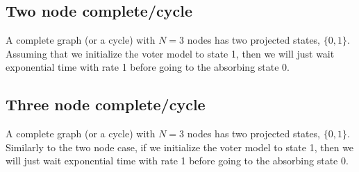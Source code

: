 \subsection{Two node complete/cycle}
A complete graph (or a cycle) with $N = 3$ nodes has two projected states, $\{0,1\}$.
Assuming that we initialize the voter model to state 1, then we will just wait exponential time with rate 1 before going to the absorbing state 0.

\subsection{Three node complete/cycle}
A complete graph (or a cycle) with $N = 3$ nodes has two projected states, $\{0,1\}$.
Similarly to the two node case, if we initialize the voter model to state 1, then we will just wait exponential time with rate 1 before going to the absorbing state 0.

